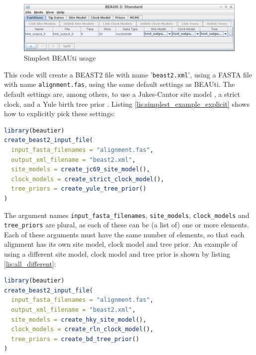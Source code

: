 \documentclass{article}
\begin{document}
\begin{figure}
  \centering
  \includegraphics[]{all_default.png}
  \caption{Simplest BEAUti usage}
  \label{fig:simplest_beauti_usage}
\end{figure}

This code will create a BEAST2 file with name '\verb;beast2.xml;',
using a FASTA file with name \verb;alignment.fas;, using the same default settings as BEAUti.
The default settings are, among others, to use a Jukes-Cantor site model \cite{cantor1969mammalian}, 
a strict clock, and a Yule birth tree prior \cite{yule1925mathematical}. Listing \ref{lis:simplest_example_explicit} shows how
to explicitly pick these settings:

\begin{lstlisting}[language=R, caption=Simplest example with explicit defaults, label=lst:simplest_example_explicit, floatplacement=H]
library(beautier)
create_beast2_input_file(
  input_fasta_filenames = "alignment.fas",
  output_xml_filename = "beast2.xml",
  site_models = create_jc69_site_model(),
  clock_models = create_strict_clock_model(),
  tree_priors = create_yule_tree_prior()
)
\end{lstlisting}

The argument names \verb;input_fasta_filenames;, \verb;site_models;, \verb;clock_models; and \verb;tree_priors; are plural, as each of these
can be (a list of) one or more elements. Each of these arguments must have the same number of elements, so that each alignment has its
own site model, clock model and tree prior. An example of using a different site model, clock model and tree prior is shown by listing \ref{lis:all_different}:

\begin{lstlisting}[language=R, caption=Example with different site model and clock model and tree prior, label=lst:all_different, floatplacement=H]
library(beautier)
create_beast2_input_file(
  input_fasta_filenames = "alignment.fas",
  output_xml_filename = "beast2.xml",
  site_models = create_hky_site_model(),
  clock_models = create_rln_clock_model(),
  tree_priors = create_bd_tree_prior()
)
\end{lstlisting}
\end{document}
